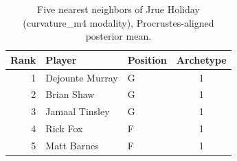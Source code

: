 \begin{table}[htbp]
  \centering\small
  \begin{tabular}{rllc}
    \toprule
    Rank & Player & Position & Archetype \\
    \midrule
    1 & Dejounte Murray & G & 1 \\
    2 & Brian Shaw & G & 1 \\
    3 & Jamaal Tinsley & G & 1 \\
    4 & Rick Fox & F & 1 \\
    5 & Matt Barnes & F & 1 \\
    \bottomrule
  \end{tabular}
  \caption{Five nearest neighbors of Jrue Holiday (curvature_m4 modality), Procrustes-aligned posterior mean.}
  \label{tab:Jrue_Holiday_neighbors_curvature_m4}
\end{table}

